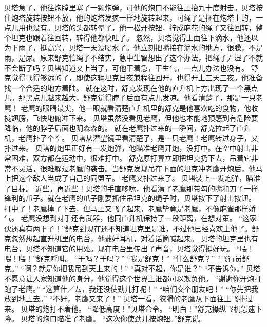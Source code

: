 \documentclass[a4paper,12pt,UTF8,twoside]{ctexbook}
\begin{document}
        贝塔急了，他往炮膛里塞了一颗炮弹，可他的炮口不能往上抬九十度射击。贝塔按住炮塔旋转按钮不放，他的炮塔发疯一样地旋转起来，可绳子是捆在炮塔上的，一点儿用也没有。贝塔的头都转晕了，他一松开按钮．拧成麻花的绳子又往回转，整个坦克也跟着往回转，转得他都快吐了。 
        忽然，贝塔觉得上面往下滴水，他还以为下雨了，挺高兴，贝塔一天没喝水了。他立刻把嘴接在滴水的地方，很臊，不是雨，是尿。原来舒克怕绳子不结实，急中生智想出了这个办法，把绳子弄湿了不就不会断了吗？贝塔知道又上当了，可他干着急，干生气，一点儿办法也没有。 
        舒克觉得飞得够远的了，即使这辆坦克日夜兼程往回开，也得开上三天三夜。他准备找一个合适的地方着陆。 
        就在这时，舒克发现在他的直升机上方出现了一个黑点儿。那黑点儿越来越大，舒克觉得脖子后面有点儿发凉。他看清楚了，那是一只老鹰！ 
        老鹰的眼睛最尖，他一眼就看清楚直升机里的舒克是他喜欢吃的食物，他收拢翅膀，飞快地俯冲下来。 
        贝塔虽然没看见老鹰，但他也本能地预感到有危险要降临，他的脖子后面也阴森森的。 
        就在老鹰扑过来的一瞬间，舒克拉起了直升机，老鹰扑了个空。 
        贝塔从潜望镜里看清楚了，是一只老鹰！老鹰转过身子，又扑过来。 
        贝塔的炮里正好有一发炮弹，他瞄准老鹰开炮，没打中。在空中射击非常困难，双方都在运动中，很难打中。 
        舒克原打算立即把坦克扔下去，吊着它非常不灵活，很难躲过老鹰的袭击。当舒克发现吊在下面的坦克冲老鹰开炮后，他马上把这个敌人当成了自己的同盟军。 
        老鹰又扑过来了。 
        贝塔装上一发炮弹，瞄准了目标。 
        近些，再近些！贝塔的手直哆嗦，他看清了老鹰那带勾的嘴和刀子一样锋利的爪子。就在老鹰的爪子刚要抓住吊坦克的绳子时，贝塔按下了射击按钮。 
        打中了！老鹰掉了下去．但马上又飞了起来，老鹰毕竟是老鹰，不像麻雀那样娇气。 
        老鹰没想到对手还有武器，他同直升机保持了一段距离，在想对策。 
        “这家伙还真有两下子！”舒克到现在还不知道坦克里是谁，不过他已经喜欢上他了。舒克忽然想起直升机里的电台，他戴好耳机，对着话筒喊起来。 
        贝塔的坦克里也有电台，贝塔不知道它的用处。现在电台里传出了声音，贝塔觉得挺好玩。 
        “喂！喂！喂！”舒克呼叫。 
        “干吗？干吗？” 
        “我是舒克！” 
        “什么舒克？” 
        “飞行员舒克。” 
        “啊？就是你把我吊到天上来的！” 
        “真对不起，你是谁？” 
        “不告诉你。” 
         贝塔不愿意让人家知道他的身分，他觉得这个世界上谁都可以欺负他。 
        “谢谢你开炮打跑了老鹰。” 
        “这算什／厶，我还没使劲儿打呢！” 
        “咱们交个朋友吧！” 
        “你先把我放到地上去。” 
        “不好，老鹰又来了！” 
        贝塔一看，狡猾的老鹰从下面往上飞扑过来。 
        贝塔的炮打不着他。 
        “降低高度！”贝塔命令。 
        “明白！”舒克操纵飞机急速下降。 
        贝塔的炮口瞄准了老鹰。 
        “这次你使劲儿按炮钮。”舒克说。 
\end{document}
